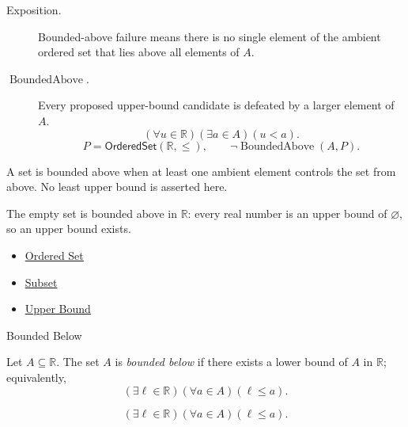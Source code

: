\begin{remark*}
\begin{description}
  \item[Exposition.]
  Bounded-above failure means there is no single element of the ambient
  ordered set that lies above all elements of $A$.

  \item[\(\operatorname{BoundedAbove}.\)]
  Every proposed upper-bound candidate is defeated by a larger element of $A$.
  \[
    (\forall u\in\mathbb{R})(\exists a\in A)(u<a).
  \]
  \[
    P=\mathsf{OrderedSet}(\mathbb{R},\leq),\qquad
    \neg\operatorname{BoundedAbove}(A,P).
  \]
\end{description}
\end{remark*}

\begin{remark*}[Interpretation]
A set is bounded above when at least one ambient element controls the set
from above.  No least upper bound is asserted here.
\end{remark*}

\begin{remark*}[Exposition]
The empty set is bounded above in $\mathbb{R}$: every real number is an upper
bound of $\varnothing$, so an upper bound exists.
\end{remark*}

\begin{dependencies}
\begin{itemize}
  \item \hyperref[def:ordered-set]{Ordered Set}
  \item \hyperref[def:subset]{Subset}
  \item \hyperref[def:real-upper-bound]{Upper Bound}
\end{itemize}
\end{dependencies}

\begin{definitionbox}{Bounded Below}
\begin{definition}
\label{def:bounded-below}
Let $A\subseteq\mathbb{R}$. The set $A$ is \emph{bounded below} if there
exists a lower bound of $A$ in $\mathbb{R}$; equivalently,
\[
  (\exists \ell\in\mathbb{R})(\forall a\in A)(\ell\leq a).
\]
\end{definition}
\end{definitionbox}

\begin{remark*}
\[
  (\exists \ell\in\mathbb{R})(\forall a\in A)(\ell\leq a).
\]
\end{remark*}

